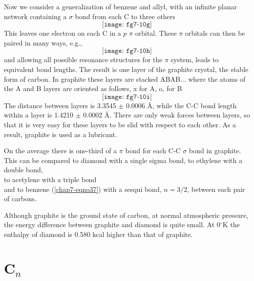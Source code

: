 Now we consider a generalization of benzene and allyl, with an 
infinite planar network containing a $\sigma$ bond from each C to three
others
\begin{equation}
\texttt{[image: fg7-10g]}
\label{chap7-eqno57}
\end{equation}
This leaves one electron on each C in a $p$ $\pi$ orbital. These $\pi$ orbitals 
can then be paired in many ways, e.g.,
\begin{equation}
\texttt{[image: fg7-10h]}
\label{chap7-eqno58}
\end{equation}
and allowing all possible resonance structures for the $\pi$ system,
leads to equivalent bond lengths.  The result is one layer of the 
graphite crystal, the stable form of carbon. In graphite these 
layers are stacked ABAB... where the atoms of the A and B layers 
are oriented as follows, x for A, o, for B
\begin{equation}
\texttt{[image: fg7-10i]}
\label{chap7-eqno59}
\end{equation}
The distance between layers is 3.3545 $\pm$ 0.0006 \AA, while 
the C-C bond length within a layer is 1.4210 $\pm$ 0.0002 \AA.  There 
are only weak forces between layers, so that it is very easy for 
these layers to be slid with respect to each other. As a result, 
graphite is used as a lubricant.

On the average there is one-third of a $\pi$ bond for each C-C $\sigma$ bond 
in graphite. This can be compared to diamond with a single 
sigma bond, to ethylene with a double bond,
\begin{equation}
\end{equation}
to acetylene with a triple bond
\begin{equation}
\end{equation}
and to benzene (\ref{chap7-eqno37}) with a sesqui bond, $n = 3/2$,
between each pair of carbons.

Although graphite is the ground state of carbon, at normal 
atmospheric pressure, the energy difference between graphite 
and diamond is quite small.  At 0$^{\circ}$K the enthalpy of diamond 
is 0.580 kcal higher than that of graphite.

\section{C$_n$}

